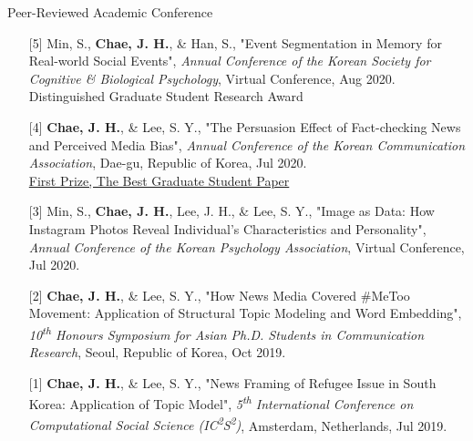 \documentclass{resume} %
\begin{document}
\begin{rSection}{Peer-Reviewed Academic Conference}
\begin{flushleft}
\begin{itemize}
\setlength{\leftskip}{-0.32in}
\setlength{\itemindent}{-0.20in}
\item[] [5] Min, S., {\bf Chae, J. H.}, \& Han, S., "Event Segmentation in Memory for Real-world Social Events", {\em Annual Conference of the Korean Society for Cognitive \& Biological Psychology}, Virtual Conference, Aug 2020.
\vspace{0.02in}
\\ \textbullet{} Distinguished Graduate Student Research Award

\item[] [4] {\bf Chae, J. H.}, \& Lee, S. Y., "The Persuasion Effect of Fact-checking News and Perceived Media Bias", {\em Annual Conference of the Korean Communication Association}, Dae-gu, Republic of Korea, Jul 2020.
\vspace{0.02in}
\\ \textbullet{} \href{https://comm.or.kr/Forum/Main/ViewContents/c80588f5-9eb3-4991-b746-7d0bd86cfb7e?ThreadId=1000012302&Page=1&SearchKey=all&Keyword=%EC%9A%B0%EC%88%98%EB%85%BC%EB%AC%B8}{First Prize, The Best Graduate Student Paper}

\item[] [3] Min, S., {\bf Chae, J. H.}, Lee, J. H., \& Lee, S. Y., "Image as Data: How Instagram Photos Reveal Individual’s Characteristics and Personality", {\em Annual Conference of the Korean Psychology Association}, Virtual Conference, Jul 2020.

\item[] [2] {\bf Chae, J. H.}, \& Lee, S. Y., "How News Media Covered \#MeToo Movement: Application of Structural Topic Modeling and Word Embedding", {\em 10\textsuperscript{th} Honours Symposium for Asian Ph.D. Students in Communication Research}, Seoul, Republic of Korea, Oct 2019.

\item[] [1] {\bf Chae, J. H.}, \& Lee, S. Y., "News Framing of Refugee Issue in South Korea: Application of Topic Model", {\em 5\textsuperscript{th} International Conference on Computational Social Science (IC\textsuperscript{2}S\textsuperscript{2})}, Amsterdam, Netherlands, Jul 2019.
\end{itemize}
\end{flushleft}
\end{rSection}
\end{document}

